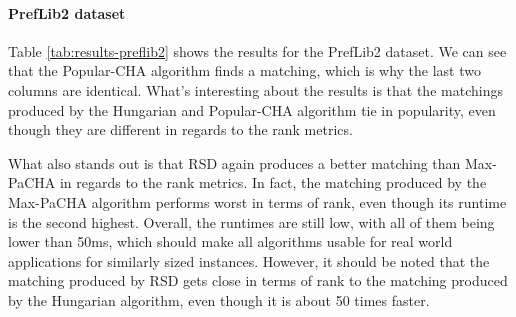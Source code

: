 \paragraph{PrefLib2 dataset}
\begin{table}[h!]
  \centering
  \caption{Summary of the results for PrefLib2}
  \label{tab:results-preflib2}
\end{table}

Table \ref{tab:results-preflib2} shows the results for the PrefLib2 dataset. We can see that the Popular-CHA algorithm finds a matching, which is why the last two columns are identical. What's interesting about the results is that the matchings produced by the Hungarian and Popular-CHA algorithm tie in popularity, even though they are different in regards to the rank metrics. 

What also stands out is that RSD again produces a better matching than Max-PaCHA in regards to the rank metrics. In fact, the matching produced by the Max-PaCHA algorithm performs worst in terms of rank, even though its runtime is the second highest. Overall, the runtimes are still low, with all of them being lower than 50ms, which should make all algorithms usable for real world applications for similarly sized instances. However, it should be noted that the matching produced by RSD gets close in terms of rank to the matching produced by the Hungarian algorithm, even though it is about 50 times faster.

